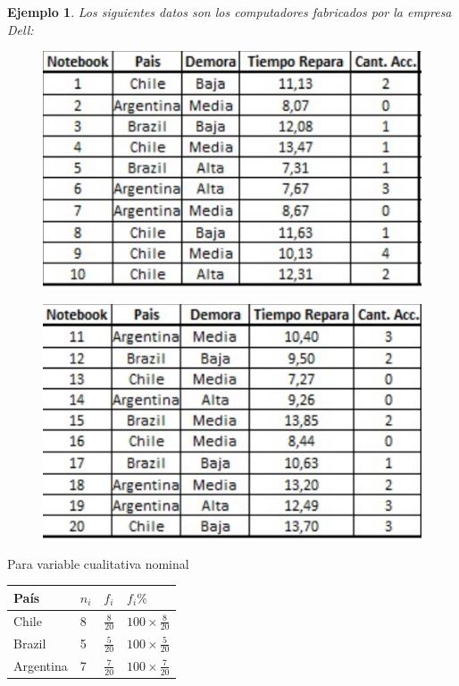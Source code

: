 \documentclass[12pt,twocolumn,a4paper]{report}
\newtheorem{ejemplo}{Ejemplo}
\begin{document}

\begin{ejemplo}
\label{ej1}
Los siguientes datos son los computadores fabricados por la empresa Dell: 
\begin{figure}[H]
\centering
\includegraphics[scale=0.5]{graficos/2.png}
\end{figure}

\begin{figure}[H]
\centering
\includegraphics[scale=0.5]{graficos/3.png}
\end{figure}
\end{ejemplo}
\newpage
Para variable cualitativa nominal
\begin{table}[H]
\begin{tabular}{|l|l|l|l|}
\hline
País      & $n_i$ & $f_i$          & $f_i\%$                  \\ \hline
Chile     & 8     & $\frac{8}{20}$ & $100\times \frac{8}{20}$ \\ \hline
Brazil    & 5     & $\frac{5}{20}$ & $100\times \frac{5}{20}$ \\ \hline
Argentina & 7     & $\frac{7}{20}$ & $100\times \frac{7}{20}$ \\ \hline
\end{tabular}
\end{table}
\end{document}

